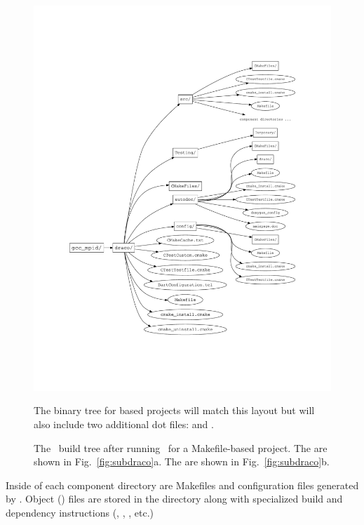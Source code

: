 \begin{figure}
  \centerline{\includegraphics[clip,trim=2cm 4cm 2cm 4cm,width=6.5in]{fig/build_tree}}
  \caption{The \draco\ build tree after running \cmake\ for a Makefile-based project.  The  are shown in
    Fig.~\ref{fig:subdraco}a. The  are shown in
    Fig.~\ref{fig:subdraco}b.}  The binary tree for  based projects will match this layout but will also include two additional dot files:  and .
  \label{fig:build_tree}
\end{figure}
Inside of each component directory are Makefiles and configuration files
generated by \cmake.  Object () files are stored in the  directory along with specialized build and dependency instructions (, , , etc.)


